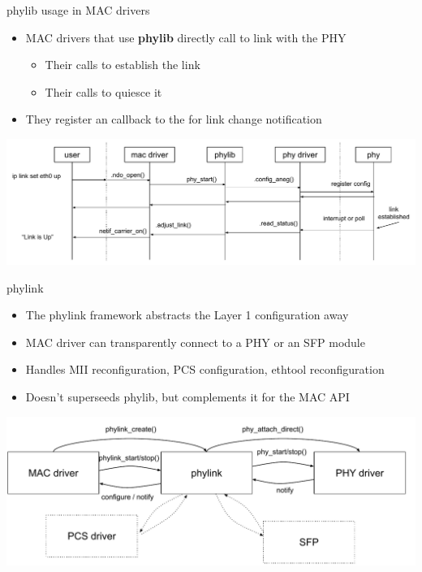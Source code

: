 \begin{frame}{phylib usage in MAC drivers}
	\begin{itemize}
		\item MAC drivers that use \textbf{phylib} directly call  to link with the PHY
			\begin{itemize}
				\item Their  calls  to establish the link
				\item Their  calls  to quiesce it
			\end{itemize}
		\item They register an  callback to the  for link change notification
	\end{itemize}
	\includegraphics[width=\textwidth]{slides/networking-driver-phy/phylib_seq.pdf}
\end{frame}

\begin{frame}{phylink}
	\begin{itemize}
		\item The phylink framework abstracts the Layer 1 configuration away
		\item MAC driver can transparently connect to a PHY or an SFP module
		\item Handles MII reconfiguration, PCS configuration, ethtool reconfiguration
		\item Doesn't superseeds phylib, but complements it for the MAC API
	\end{itemize}
	\includegraphics[width=\textwidth]{slides/networking-driver-phy/phylink.pdf}
\end{frame}

